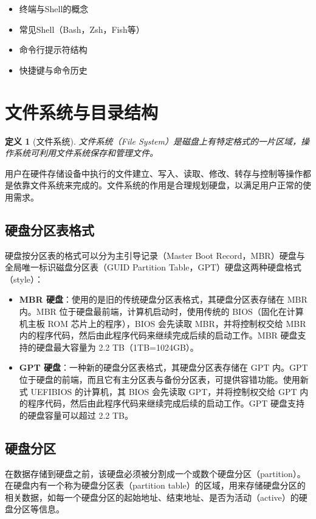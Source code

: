 \documentclass[12pt,UTF8]{ctexbook}
\newtheorem{definition}{定义}[chapter]
\begin{document}
\begin{itemize}
    \item 终端与Shell的概念
    \item 常见Shell（Bash，Zsh，Fish等）
    \item 命令行提示符结构
    \item 快捷键与命令历史
\end{itemize}

\section{文件系统与目录结构}
\begin{definition}[文件系统]
文件系统（File System）是磁盘上有特定格式的一片区域，操作系统可利用文件系统保存和管理文件。
\end{definition}

用户在硬件存储设备中执行的文件建立、写入、读取、修改、转存与控制等操作都是依靠文件系统来完成的。文件系统的作用是合理规划硬盘，以满足用户正常的使用需求。

\subsection{硬盘分区表格式}
硬盘按分区表的格式可以分为主引导记录（Master Boot Record，MBR）硬盘与全局唯一标识磁盘分区表（GUID Partition Table，GPT）硬盘这两种硬盘格式（style）：

\begin{itemize}
    \item \textbf{MBR 硬盘}：使用的是旧的传统硬盘分区表格式，其硬盘分区表存储在 MBR 内。MBR 位于硬盘最前端，计算机启动时，使用传统的 BIOS（固化在计算机主板 ROM 芯片上的程序），BIOS 会先读取 MBR，并将控制权交给 MBR 内的程序代码，然后由此程序代码来继续完成后续的启动工作。MBR 硬盘支持的硬盘最大容量为 2.2 TB（1TB=1024GB）。
    \item \textbf{GPT 硬盘}：一种新的硬盘分区表格式，其硬盘分区表存储在 GPT 内。GPT 位于硬盘的前端，而且它有主分区表与备份分区表，可提供容错功能。使用新式 UEFIBIOS 的计算机，其 BIOS 会先读取 GPT，并将控制权交给 GPT 内的程序代码，然后由此程序代码来继续完成后续的启动工作。GPT 硬盘支持的硬盘容量可以超过 2.2 TB。
\end{itemize}

\subsection{硬盘分区}
在数据存储到硬盘之前，该硬盘必须被分割成一个或数个硬盘分区（partition）。在硬盘内有一个称为硬盘分区表（partition table）的区域，用来存储硬盘分区的相关数据，如每一个硬盘分区的起始地址、结束地址、是否为活动（active）的硬盘分区等信息。
\end{document}
